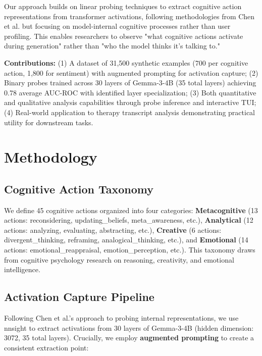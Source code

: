 \documentclass[letterpaper]{article}
\begin{document}
Our approach builds on linear probing techniques \cite{alain2016understanding} to extract cognitive action representations from transformer activations, following methodologies from Chen et al. \cite{chen2024designing} but focusing on model-internal cognitive processes rather than user profiling. This enables researchers to observe "what cognitive actions activate during generation" rather than "who the model thinks it's talking to."

\textbf{Contributions:} (1) A dataset of 31,500 synthetic examples (700 per cognitive action, 1,800 for sentiment) with augmented prompting for activation capture; (2) Binary probes trained across 30 layers of Gemma-3-4B (35 total layers) achieving 0.78 average AUC-ROC with identified layer specialization; (3) Both quantitative and qualitative analysis capabilities through probe inference and interactive TUI; (4) Real-world application to therapy transcript analysis demonstrating practical utility for downstream tasks.

\section{Methodology}

\subsection{Cognitive Action Taxonomy}

We define 45 cognitive actions organized into four categories: \textbf{Metacognitive} (13 actions: reconsidering, updating\_beliefs, meta\_awareness, etc.), \textbf{Analytical} (12 actions: analyzing, evaluating, abstracting, etc.), \textbf{Creative} (6 actions: divergent\_thinking, reframing, analogical\_thinking, etc.), and \textbf{Emotional} (14 actions: emotional\_reappraisal, emotion\_perception, etc.). This taxonomy draws from cognitive psychology research on reasoning, creativity, and emotional intelligence.

\subsection{Activation Capture Pipeline}

Following Chen et al.'s \cite{chen2024designing} approach to probing internal representations, we use nnsight to extract activations from 30 layers of Gemma-3-4B (hidden dimension: 3072, 35 total layers). Crucially, we employ \textbf{augmented prompting} to create a consistent extraction point:
\end{document}

